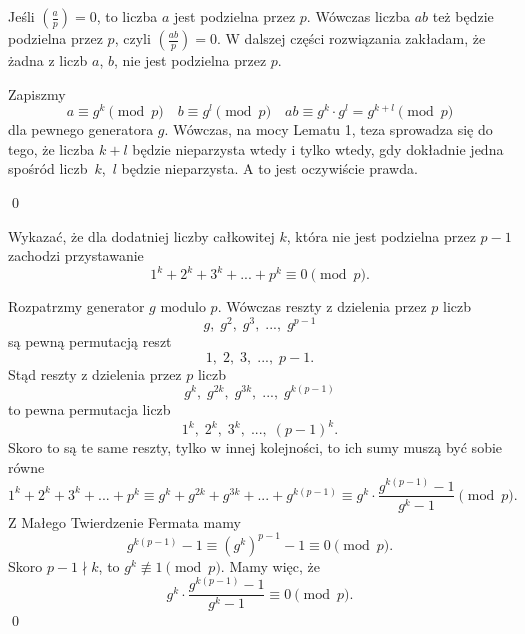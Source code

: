 
\noindent
Jeśli $\left(\frac{a}{p}\right) = 0$, to liczba $a$ jest podzielna przez $p$. Wówczas liczba $ab$ też będzie podzielna przez $p$, czyli $\left(\frac{ab}{p}\right) = 0$. W dalszej części rozwiązania zakładam, że żadna z liczb $a$, $b$, nie jest podzielna przez $p$.

\noindent
Zapiszmy
\[
	a \equiv g^k \pmod{p} \quad b \equiv g^l \pmod{p} \quad ab \equiv g^k \cdot g^l = g^{k + l} \pmod{p}
\]
dla pewnego generatora $g$. Wówczas, na mocy Lematu 1, teza sprowadza się do tego, że liczba $k + l$ będzie nieparzysta wtedy i tylko wtedy, gdy dokładnie jedna spośród liczb~$k$,~$l$ będzie nieparzysta. A to jest oczywiście prawda.

\qed

\vspace{10px}


\noindent
Wykazać, że dla dodatniej liczby całkowitej $k$, która nie jest podzielna przez $p - 1$ zachodzi przystawanie
\[
	1^k + 2^k + 3^k + ... + p^k \equiv 0 \pmod{p}.
\]

\vspace{10px}


\noindent
Rozpatrzmy generator $g$ modulo $p$. Wówczas reszty z dzielenia przez $p$ liczb
\[
	g,\; g^2,\; g^3,\; ...,\; g^{p - 1}
\]
są pewną permutacją reszt
\[
	1,\; 2,\; 3,\; ...,\;  p - 1.
\]
Stąd reszty z dzielenia przez $p$ liczb
\[
	g^k,\; g^{2k},\; g^{3k},\; ...,\; g^{k(p - 1)}
\]
to pewna permutacja liczb
\[
	1^k,\; 2^k,\; 3^k,\; ...,\;  (p - 1)^k.
\]
Skoro to są te same reszty, tylko w innej kolejności, to ich sumy muszą być sobie równe
\[
	1^k + 2^k + 3^k + ... + p^k \equiv g^k + g^{2k} + g^{3k} +  ... + g^{k(p - 1)} \equiv g^k \cdot \frac{g^{k(p - 1)} - 1}{g^k - 1} \pmod{p}.
\]
Z Małego Twierdzenie Fermata mamy
\[
	g^{k(p - 1)} - 1 \equiv \left(g^{k}\right)^{p - 1} - 1 \equiv 0 \pmod{p}. 
\]
Skoro $p - 1 \nmid k$, to $g^k \not\equiv 1 \pmod{p}$. Mamy więc, że
\[
	g^k \cdot \frac{g^{k(p - 1)} - 1}{g^k - 1} \equiv 0 \pmod{p}.
\]
\qed
